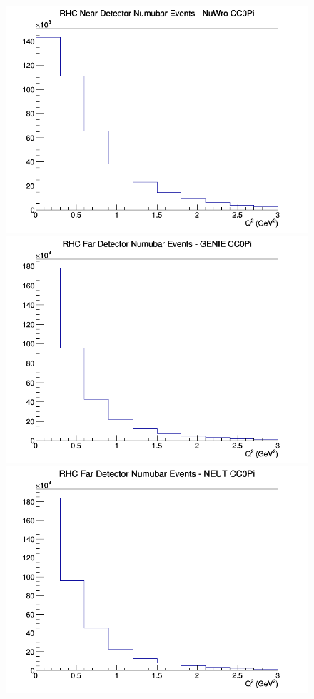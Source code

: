 \documentclass[12pt]{article}
\begin{document}
\begin{figure}[h]
\includegraphics[width=\linewidth]{Q2/nominal/CC0Pi_RHC_ND_numubar_Q2_NuWro.png}
\endminipage
\newline
{}
\includegraphics[width=\linewidth]{Q2/nominal/CC0Pi_RHC_FD_numubar_Q2_GENIE.png}
\endminipage
{}
\includegraphics[width=\linewidth]{Q2/nominal/CC0Pi_RHC_FD_numubar_Q2_NEUT.png}

\end{figure}
\end{document}

